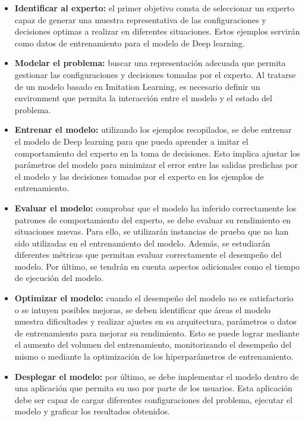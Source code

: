 \begin{itemize}
    \item \textbf{Identificar al experto:} el primer objetivo consta de seleccionar un
          experto capaz de generar una muestra representativa de las configuraciones y decisiones
          optimas a realizar en diferentes situaciones. Estos ejemplos servirán como datos
          de entrenamiento para el modelo de Deep learning.
    \item \textbf{Modelar el problema:} buscar una representación adecuada que permita gestionar
          las configuraciones y decisiones tomadas por el experto. Al tratarse de un modelo basado en
          Imitation Learning, es necesario definir un environment que permita la interacción entre el
          modelo y el estado del problema.
    \item \textbf{Entrenar el modelo:} utilizando los ejemplos recopilados, se debe entrenar
          el modelo de Deep learning para que pueda aprender a imitar el comportamiento
          del experto en la toma de decisiones. Esto implica ajustar los parámetros del modelo para
          minimizar el error entre las salidas predichas por el modelo y las decisiones tomadas por
          el experto en los ejemplos de entrenamiento.
    \item \textbf{Evaluar el modelo:} comprobar que el modelo ha inferido correctamente
          los patrones de comportamiento del experto, se debe evaluar su rendimiento en situaciones
          nuevas. Para ello, se utilizarán instancias de prueba que no han sido utilizadas en el
          entrenamiento del modelo. Además, se estudiarán diferentes métricas que permitan evaluar
          correctamente el desempeño del modelo. Por último, se tendrán en cuenta aspectos adicionales
          como el tiempo de ejecución del modelo.
    \item \textbf{Optimizar el modelo:} cuando el desempeño del modelo no es satisfactorio o
          se intuyen posibles mejoras, se deben identificar que áreas el modelo muestra dificultades y realizar ajustes
          en su arquitectura, parámetros o datos de entrenamiento para mejorar su rendimiento. Esto
          se puede lograr mediante el aumento del volumen del entrenamiento, monitorizando el desempeño
          del mismo o mediante la optimización de los hiperparámetros de entrenamiento.
    \item \textbf{Desplegar el modelo:} por último, se debe implementar el modelo dentro de
          una aplicación que permita su uso por parte de los usuarios. Esta aplicación debe ser capaz
          de cargar diferentes configuraciones del problema, ejecutar el modelo y graficar los resultados
          obtenidos.
\end{itemize}

